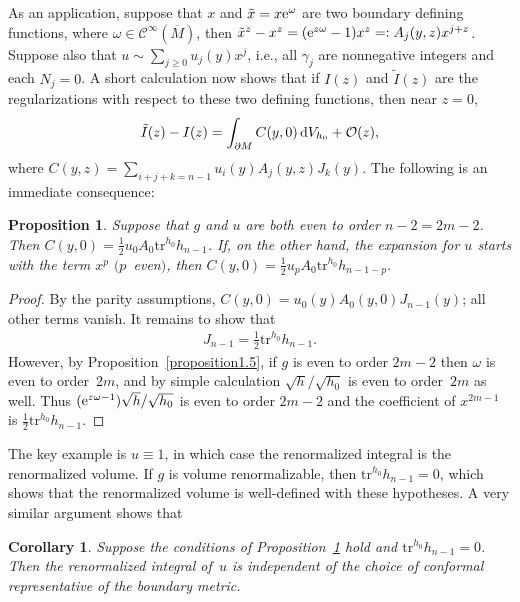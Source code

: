 \documentclass[pdftex]{sigma}
\numberwithin{equation}{section}
\newtheorem{Corollary}[Theorem]{Corollary}
\newtheorem{Proposition}[Theorem]{Proposition}
 { \theoremstyle{definition}
\newtheorem{Definition}[Theorem]{Definition}
\newtheorem{Example}[Theorem]{Example}
\newtheorem{Remark}[Theorem]{Remark} }
\newcommand{\calC}{\mathcal C}
\newcommand{\tr}{\mathrm{tr}}
\begin{document}
As an application, suppose that $x$ and $\tilde{x} = x {\rm e}^\omega$ are two boundary defining functions, where $\omega \in \calC^\infty(\overline{M})$, then
$\tilde{x}^z - x^z = ({\rm e}^{z\omega}-1) x^z =: A_j(y,z) x^{j + z}$. Suppose also that $u \sim \sum\limits_{j \geq 0} u_j(y) x^j$, i.e., all $\gamma_j$ are nonnegative integers and each $N_j = 0$. A short calculation now shows that if $I(z)$ and $\tilde{I}(z)$ are the regularizations with respect to these two defining functions, then near $z=0$,
\begin{gather*}%
\tilde{I}(z) - I(z) = \int_{\partial M} C(y,0) \, {\rm d}V_{h_{0}} +{\mathcal O}(z) ,
\end{gather*}
where $C(y,z) = \sum\limits_{i+j+k=n-1} u_i(y) A_j(y,z) J_k(y)$. The following is an immediate consequence:
\begin{Proposition} \label{proposition4.2}
Suppose that $g$ and $u$ are both even to order $n-2 = 2m-2$. Then $C(y,0)=\frac12 u_{0} A_0 \tr^{h_{0}} h_{n-1}$. If, on the other hand,
the expansion for $u$ starts with the term $x^p$ $(p$~even$)$, then $C(y,0) = \frac12 u_p A_0 \tr^{h_0} h_{n-1-p}$.
\end{Proposition}
\begin{proof}By the parity assumptions, $C(y,0) = u_0(y) A_0(y,0) J_{n-1}(y)$; all other terms vanish. It remains to show that
\begin{gather*}%
J_{n-1} = \frac12 \tr^{h_0} h_{n-1}.
\end{gather*}
However, by Proposition~\ref{proposition1.5}, if $g$ is even to order $2m-2$ then $\omega$ is even to order~$2m$, and by simple calculation
$\sqrt{h}/\sqrt{h_{0}}$ is even to order~$2m$ as well. Thus $({\rm e}^{z\omega-1})\sqrt{h}/\sqrt{h_{0}}$ is even to order $2m-2$ and the coefficient of
$x^{2m-1}$ is $\frac{1}{2} \tr^{h_{0}} h_{n-1}$.
\end{proof}

The key example is $u\equiv 1$, in which case the renormalized integral is the renormalized volume. If $g$ is volume renormalizable, then $\tr^{h_{0}}h_{n-1} = 0$,
which shows that the renormalized volume is well-defined with these hypotheses. A very similar argument shows that

\begin{Corollary}\label{corollary4.3}Suppose the conditions of Proposition~{\rm \ref{proposition4.2}} hold and $\tr^{h_{0}} h_{n-1}=0$. Then the renormalized integral of~$u$ is independent of the choice of conformal representative of the boundary metric.
\end{Corollary}
\end{document}

